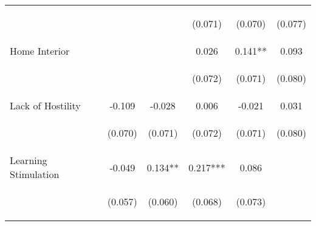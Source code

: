 \begin{tabular}{lccccc}
 & \begin{footnotesize}\end{footnotesize} & \begin{footnotesize}\end{footnotesize} & \begin{footnotesize}(0.071)\end{footnotesize} & \begin{footnotesize}(0.070)\end{footnotesize} & \begin{footnotesize}(0.077)\end{footnotesize}\\
\noalign{\smallskip}Home Interior &  &  & 0.026 & 0.141** & 0.093\\
 & \begin{footnotesize}\end{footnotesize} & \begin{footnotesize}\end{footnotesize} & \begin{footnotesize}(0.072)\end{footnotesize} & \begin{footnotesize}(0.071)\end{footnotesize} & \begin{footnotesize}(0.080)\end{footnotesize}\\
\noalign{\smallskip}Lack of Hostility & -0.109 & -0.028 & 0.006 & -0.021 & 0.031\\
 & \begin{footnotesize}(0.070)\end{footnotesize} & \begin{footnotesize}(0.071)\end{footnotesize} & \begin{footnotesize}(0.072)\end{footnotesize} & \begin{footnotesize}(0.071)\end{footnotesize} & \begin{footnotesize}(0.080)\end{footnotesize}\\
\noalign{\smallskip}Learning Stimulation & -0.049 & 0.134** & 0.217*** & 0.086 & \\
 & \begin{footnotesize}(0.057)\end{footnotesize} & \begin{footnotesize}(0.060)\end{footnotesize} & \begin{footnotesize}(0.068)\end{footnotesize} & \begin{footnotesize}(0.073)\end{footnotesize} & \begin{footnotesize}\end{footnotesize}\\

\end{tabular}
